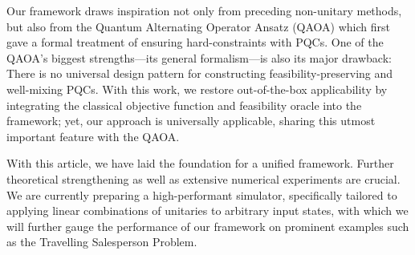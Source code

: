 \documentclass[10pt,conference]{IEEEtran}
\begin{document}
Our framework draws inspiration not only from preceding non-unitary methods, but also from the Quantum Alternating Operator Ansatz (QAOA) which first gave a formal treatment of ensuring hard-constraints with PQCs.
One of the QAOA's biggest strengths---its general formalism---is also its major drawback:
There is no universal design pattern for constructing feasibility-preserving and well-mixing PQCs.
With this work, we restore out-of-the-box applicability by integrating the classical objective function and feasibility oracle into the framework;
yet, our approach is universally applicable, sharing this utmost important feature with the QAOA.

With this article, we have laid the foundation for a unified framework.
Further theoretical strengthening as well as extensive numerical experiments are crucial.
We are currently preparing a high-performant simulator, specifically tailored to applying linear combinations of unitaries to arbitrary input states, with which we will further gauge the performance of our framework on prominent examples such as the Travelling Salesperson Problem.



\end{document}

